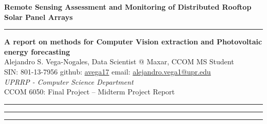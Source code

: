 \documentclass[a4paper,12pt]{article}
\begin{document}
\pagestyle{fancy}
\thispagestyle{empty}
\renewcommand*{\thefootnote}{\fnsymbol{footnote}}
\begin{center}
\Large{\textbf{Remote Sensing Assessment and Monitoring of Distributed Rooftop Solar Panel Arrays}}
\vspace{0.5cm}
{\color{gray}\hrule}
\medskip
\large\textbf{A report on methods for Computer Vision extraction and Photovoltaic energy forecasting} \\
\bigskip
\normalsize Alejandro S. Vega-Nogales, Data Scientist @ Maxar, CCOM MS Student \\
\vspace{0.1cm}
SIN: 801-13-7956 \quad github: \href{https://github.com/avega17}{avega17}  \quad email: \href{mailto:alejandro.vega1@upr.edu}{alejandro.vega1@upr.edu} \\
\vspace{0.1cm}
\textit{UPRRP - Computer Science Department} \\
\vspace{0.1cm}
CCOM 6050: Final Project -- Midterm Project Report
\medskip
\normalsize
\end{center}
{\color{gray}\hrule}
\vspace{0.4cm}

\tableofcontents
\hfill
\clearpage


{\color{gray}\hrule}
\clearpage

{\color{gray}\hrule}
\medskip




\clearpage


\end{document}
